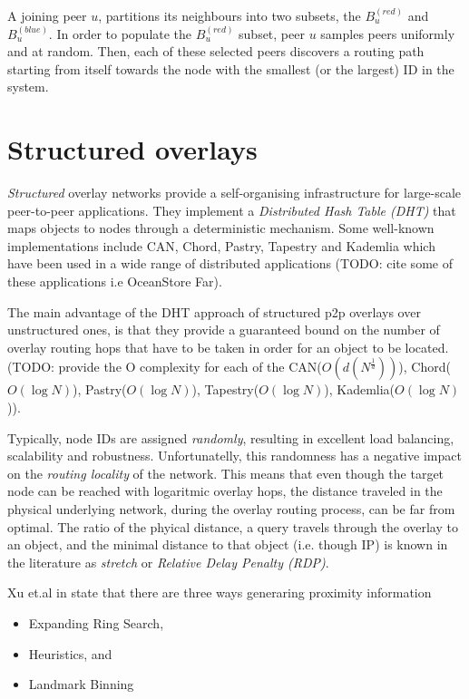 \documentclass[a4paper,10pt]{article}
\begin{document}
A joining peer $u$, partitions its neighbours into two subsets, the $B_u^{\left( red \right)}$ and $B_u^{\left( blue \right)}$. In order to populate the $B_u^{\left( red \right)}$ subset, peer $u$ samples peers uniformly and at random. Then, each of these selected peers discovers a routing path starting from itself towards the node with the smallest (or the largest) ID in the system.

\section{Structured overlays}
\emph{Structured} overlay networks provide a self-organising infrastructure for large-scale peer-to-peer applications. They implement a \emph{Distributed Hash Table (DHT)} that maps objects to nodes through a deterministic mechanism. Some well-known implementations include CAN\cite{ratnasamy_can_2001}, Chord\cite{stoica_chord_2001}, Pastry\cite{antony_pastry_2001}, Tapestry\cite{zhao_tapestry_2001} and Kademlia\cite{maymounkov_kademlia_2002} which have been used in a wide range of distributed applications (TODO: cite some of these applications i.e OceanStore Far).

The main advantage of the DHT approach of structured p2p overlays over unstructured ones, is that they provide a guaranteed bound on the number of overlay routing hops that have to be taken in order for an object to be located. (TODO: provide the O complexity for each of the CAN($O(d(N^{\frac{1}{d}}))$), Chord($O(\log N)$), Pastry($O(\log N)$), Tapestry($O(\log N)$), Kademlia($O(\log N)$)).


Typically, node IDs are assigned \emph{randomly}, resulting in excellent load balancing, scalability and robustness. Unfortunatelly, this randomness has a negative impact on the \emph{routing locality} of the network. This means that even though the target node can be reached with logaritmic overlay hops, the distance traveled in the physical underlying network, during the overlay routing process, can be far from optimal. The ratio of the phyical distance, a query travels through the overlay to an object, and the minimal distance to that object (i.e. though IP) is known in the literature as \emph{stretch} or \emph{Relative Delay Penalty (RDP)}.

Xu et.al in \cite{xu_globstate_2003} state that there are three ways generaring proximity information
\begin{itemize}
 \item Expanding Ring Search,
 \item Heuristics, and
 \item Landmark Binning
\end{itemize}
\end{document}
